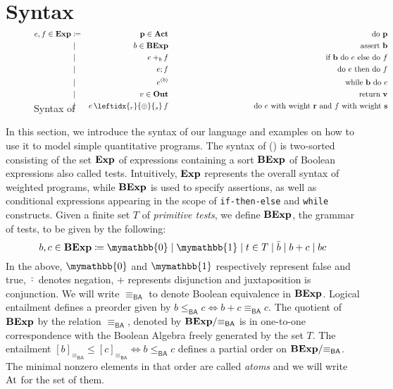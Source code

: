 \documentclass[a4paper,UKenglish,cleveref, autoref, thm-restate]{lipics-v2021}
\newcommand{\Out}{\textbf{\upshape{Out}}}
\newcommand{\Act}{\textbf{\upshape{Act}}}
\newcommand{\At}{\text{\upshape{At}}}
\newcommand{\Exp}{\textbf{\upshape{Exp}}}
\newcommand{\BA}{\textsf{BA}}
\newcommand{\BExp}{\textbf{\upshape{BExp}}}
\newcommand{\WC}[2]{\,\leftidx{_{#1}}{{\oplus}}{_{#2}}\,}
\newcommand{\bskip}{\mymathbb{1}}
\newcommand{\babort}{\mymathbb{0}}
\newcommand{\wgkat}{\textsf{\upshape{wGKAT}}\xspace}
\theoremstyle{plain}\newtheoremrep{thm}{Theorem}[section]
\begin{document}
		\section{Syntax}\label{syntaxS}
		\begin{figure}[t]
			\begin{alignat*}{10}
			\\[-6ex]
	e,f \in \Exp &\coloneq& \; \textbf{p} \in \Act&\qquad& \text{do } \textbf{p}\\
			&\mid&b \in \BExp&\qquad\qquad\qquad\qquad\qquad& \text{assert } \textbf{b}\\
			&\mid&e +_b f &\qquad\qquad& \text{if }\textbf{b}\text{ do }e\text{ else do } f\\
			&\mid&e;f &\qquad\qquad& \text{do }e\text{ then do }f\\
			&\mid&e^{(b)}&\qquad\qquad& \text{while } \textbf{b} \text{ do } e\\
			&\mid&v \in \Out&\qquad\qquad& \text{return } \textbf{v}\\
			&\mid&e \WC{r}{s} f &\qquad\qquad& \text{do } e \text{ with weight } \textbf{r} \text{ and } f \text{ with weight } \textbf{s}\\[-6ex]
			\end{alignat*}
			\caption{Syntax of \wgkat}
			\label{semisyntax}
		\end{figure}
		In this section, we introduce the syntax of our language and examples on how to use it to model simple quantitative programs. 
	The syntax of \wgkat () is two-sorted consisting of the set $\Exp$ of expressions containing a sort $\BExp$ of Boolean expressions also called tests. Intuitively, $\Exp$ represents the overall syntax of weighted programs, while $\BExp$ is used to specify assertions, as well as conditional expressions appearing in the scope of \texttt{if-then-else} and \texttt{while} constructs. Given a finite set $T$ of \emph{primitive tests}, we define $\BExp$, the grammar of tests, to be given by the following:
			$$b,c \in \BExp\coloneq \babort \mid \bskip \mid t\in T \mid \bar b \mid b+c \mid bc$$
	In the above, $\babort$ and $\bskip$ respectively represent false and true, $\bar{\cdot}$ denotes negation, $+$ represents disjunction and juxtaposition is conjunction. We will write $\equiv_{\BA}$ to denote Boolean equivalence in $\BExp$. Logical entailment defines a preorder given by $b \leq_{\BA} c \iff b + c \equiv_{\BA} c$. The quotient of $\BExp$ by the relation $\equiv_{\BA}$, denoted by ${\BExp}/{\equiv_{\BA}}$ is in one-to-one correspondence with the Boolean Algebra freely generated by the set $T$. The entailment $[b]_{\equiv_{\BA}} \leq [c]_{\equiv_{\BA}} \iff b \leq_{\BA} c$ defines a partial order on ${\BExp}/{\equiv_{\BA}}$. The minimal nonzero elements in that order are called \emph{atoms} and we will write $\At$ for the set of them. 
			
\end{document}
